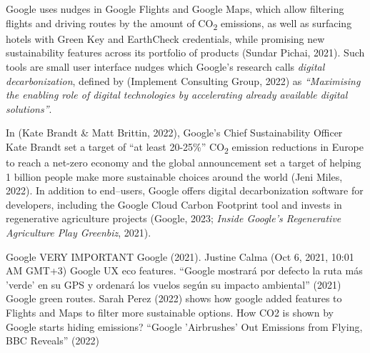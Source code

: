 \documentclass[
  letterpaper,
  DIV=11,
  numbers=noendperiod]{scrartcl}
\begin{document}
Google uses nudges in Google Flights and Google Maps, which allow
filtering flights and driving routes by the amount of
CO\textsubscript{2} emissions, as well as surfacing hotels with Green
Key and EarthCheck credentials, while promising new sustainability
features across its portfolio of products (Sundar Pichai, 2021). Such
tools are small user interface nudges which Google's research calls
\emph{digital decarbonization}, defined by (Implement Consulting Group,
2022) as \emph{``Maximising the enabling role of digital technologies by
accelerating already available digital solutions''}.

In (Kate Brandt \& Matt Brittin, 2022), Google's Chief Sustainability
Officer Kate Brandt set a target of ``at least 20-25\%''
CO\textsubscript{2} emission reductions in Europe to reach a net-zero
economy and the global announcement set a target of helping 1 billion
people make more sustainable choices around the world (Jeni Miles,
2022). In addition to end--users, Google offers digital decarbonization
software for developers, including the Google Cloud Carbon Footprint
tool and invests in regenerative agriculture projects (Google, 2023;
\emph{Inside {Google}'s Regenerative Agriculture Play {\textbar}
{Greenbiz}}, 2021).

Google VERY IMPORTANT Google (2021). Justine Calma (Oct 6, 2021, 10:01
AM GMT+3) Google UX eco features. {``{Google mostrar{á} por defecto la
ruta m{á}s 'verde' en su GPS y ordenar{á} los vuelos seg{ú}n su impacto
ambiental}''} (2021) Google green routes. Sarah Perez (2022) shows how
google added features to Flights and Maps to filter more sustainable
options. How CO2 is shown by Google starts hiding emissions? {``Google
'Airbrushes' Out Emissions from Flying, {BBC} Reveals''} (2022)
\end{document}
